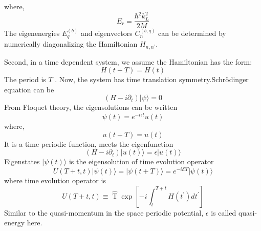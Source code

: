 \documentclass{article}
\begin{document}
    where, 
    \begin{equation}
        E_{r}=\frac{\hbar^{2} k_{L}^{2}}{2 M}
    \end{equation}
    The eigenenergies $E_{q}^{(b)}$ and eigenvectors $C_{n}^{(b, q)}$ can be determined by numerically diagonalizing the Hamiltonian $H_{n, n^{\prime}}$.
    
    
    Second, in a time dependent system, we assume the Hamiltonian has the form:
    \begin{equation}
        H(t+T)=H(t)
    \end{equation}
    The period is $T$ .
    Now, the system has time translation symmetry.Schrödinger equation can be
    \begin{equation}
        \left(H-i \partial_{t}\right)|\psi\rangle= 0
    \end{equation}
    From Floquet theory, the eigensolutions can be written
    \begin{equation}
        \psi(t)=e^{-i \epsilon t} u(t)
    \end{equation}
    where,
    \begin{equation}
        u(t+T)=u(t)
    \end{equation}
    It is a time periodic function, meets the eigenfunction
    \begin{equation}
        \left(H-i \partial_{t}\right)|u(t)\rangle=\epsilon|u(t)\rangle
    \end{equation}
    Eigenstates $|\psi(t)\rangle$ is the eigensolution of time evolution operator
    \begin{equation}
        U(T+t, t)|\psi(t)\rangle=|\psi(t+T)\rangle= e^{-i \mathcal{E} T}|\psi(t)\rangle
    \end{equation}
    where time evolution operator is
    \begin{equation}
        U(T+t, t) \equiv \hat{\operatorname{T}} \exp \left[-i \int_{t}^{T+t} H\left(t^{\prime}\right) d t^{\prime}\right]
    \end{equation}
    Similar to the quasi-momentum in the space periodic potential, $\epsilon$ is called quasi-energy here.
\end{document}
